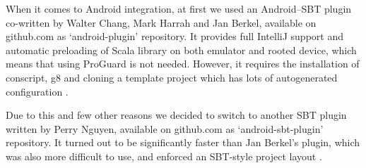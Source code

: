 When it comes to Android integration, at first we used an Android--SBT plugin co-written by Walter Chang, Mark Harrah and Jan Berkel, available on github.com as `android-plugin' repository. It provides full IntelliJ support and automatic preloading of Scala library on both emulator and rooted device, which means that using ProGuard is not needed. However, it requires the installation of conscript, g8 and cloning a template project which has lots of autogenerated configuration \cite{Nguyen:2013:differences}.

Due to this and few other reasons we decided to switch to another SBT plugin written by Perry Nguyen, available on github.com as `android-sbt-plugin' repository. It turned out to be significantly faster than Jan Berkel's plugin, which was also more difficult to use, and enforced an SBT-style project layout \cite{Nguyen:2013:differences}.
